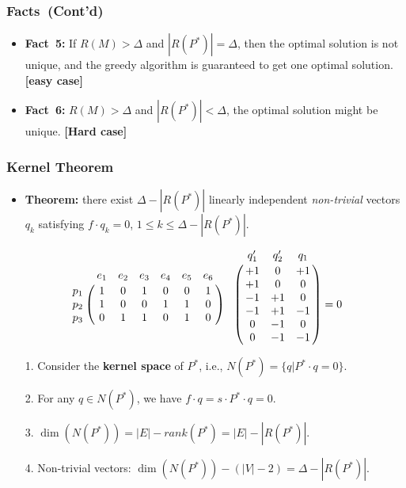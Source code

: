 \frame
{
	\frametitle{Facts~(Cont'd)}

	\vspace{0.3cm}
	\begin{itemize}
	\item<1-> {\bf Fact~5:} If $R(M) > \Delta$ and $|R(P^*)| = \Delta$, then the optimal solution is not unique,
		and the greedy algorithm is guaranteed to get one optimal solution. {\bf [easy case]}
	\end{itemize}

	\vspace{0.5cm}
	

	\vspace{0.4cm}

	\begin{itemize}
	\item<1-> {\bf Fact~6:} $R(M) > \Delta$ and $|R(P^*)| < \Delta$, the optimal solution
		might be unique. {\bf [Hard case]} 
	\end{itemize}

	\vspace{0.5cm}
	
	\vspace{-0.1cm}

}

\frame
{
	\frametitle{Kernel Theorem}
	\begin{itemize}
	\item {\bf Theorem:} there exist $\Delta - |R(P^*)|$ linearly independent
	{\it non-trivial} vectors $q_k$ satisfying $f\cdot q_k = 0$, $1\le k\le \Delta - |R(P^*)|$.
	\end{itemize}

	\vspace{0.6cm}

	

	\vspace{-0.5cm}

	\begin{displaymath}
	\bordermatrix{
		~   & e_1 & e_2 & e_3 & e_4 & e_5 & e_6\cr
		p_1 & 1 & 0 & 1 & 0 & 0 & 1 \cr
		p_2 & 1 & 0 & 0 & 1 & 1 & 0 \cr
		p_3 & 0 & 1 & 1 & 0 & 1 & 0 \cr
	} 
	\bordermatrix{
   	   ~& q'_1 & q'_2 & q_1 \cr
		& +1 &  0 & +1  \cr
		& +1 &  0 &  0  \cr
		& -1 & +1 &  0  \cr
		& -1 & +1 & -1  \cr
		&  0 & -1 &  0  \cr
		&  0 & -1 & -1  \cr
	} = 0
	\end{displaymath}

	\begin{itemize}
	\item[1.] Consider the {\bf kernel space} of $P^*$, i.e., $N(P^*) = \{q | P^*\cdot q = 0\}$.
	\item[2.] For any $q\in N(P^*)$, we have $f\cdot q = s\cdot P^* \cdot q = 0$. 
	\item[3.] $\dim(N(P^*)) = |E| - rank(P^*) = |E| - |R(P^*)|$. 
	\item[4.] Non-trivial vectors: $\dim(N(P^*)) - (|V| - 2) = \Delta - |R(P^*)|$. 
	\end{itemize}
}

